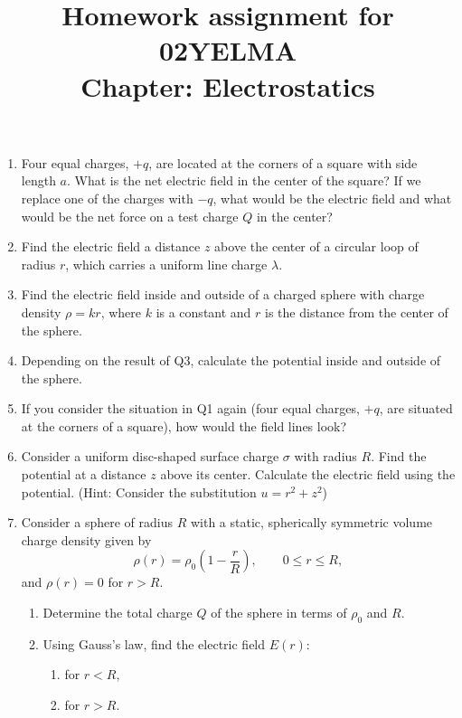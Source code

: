 \documentclass[12pt]{article}
\title{Homework assignment for 02YELMA \\ Chapter: Electrostatics}
\begin{document}
\date{}
\maketitle
\vspace{-0.8in}

\begin{enumerate}
    \item Four equal charges, $+q$, are located at the corners of a square with side length $a$. What is the net electric field in the center of the square?  If we replace one of the charges with $-q$, what would be the electric field and what would be the net force on a test charge $Q$ in the center?
    
    \item Find the electric field a distance $z$ above the center of a circular loop of radius $r$, which carries a uniform line charge $\lambda$.
    
    \item  Find the electric field inside and outside of a charged sphere with charge density $\rho=kr$, where $k$ is a constant and $r$ is the distance from the center of the sphere.
    
    \item Depending on the result of Q3, calculate the potential inside and outside of the sphere.

    \item If you consider the situation in Q1 again (four equal charges, $+q$, are situated at the corners of a square), how would the field lines look?

    \item Consider a uniform disc-shaped surface charge $\sigma$ with radius $R$. Find the potential at a distance $z$ above its center. Calculate the electric field using the potential. (Hint: Consider the substitution $u=r^2+z^2$)
    
    \item Consider a sphere of radius $R$ with a static, spherically symmetric volume charge density given by
    \[
    \rho(r) = \rho_0 \left(1 - \frac{r}{R}\right),
    \qquad 0 \le r \le R,
    \]
    and $\rho(r) = 0$ for $r > R$.

    \begin{enumerate}
    \item Determine the total charge $Q$ of the sphere in terms of $\rho_0$ and $R$.
    
    \item Using Gauss’s law, find the electric field $E(r)$:
    \begin{enumerate}
        \item for $r < R$,
        \item for $r > R$.
    \end{enumerate}
    

\end{enumerate}
\end{enumerate}
\end{document}
